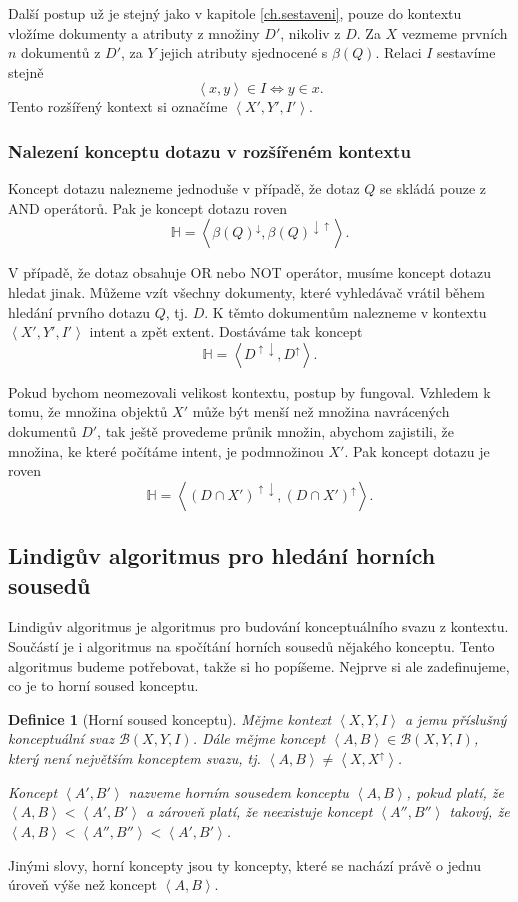 \documentclass[12pt]{article}
\newcommand{\ssection}[1]{\subsection{#1}}
\newcommand{\sssection}[1]{\subsubsection{#1}}
\newcommand{\addsp}[1]{\left<#1\right>}
\newcommand{\context}{\addsp{X, Y, I}}
\newcommand{\lattice}{\mathcal{B}(X, Y, I)}
\newcommand{\up}{^{\uparrow}}
\newcommand{\down}{^{\downarrow}}
\newcommand{\updown}{^{\uparrow\downarrow}}
\newcommand{\downup}{^{\downarrow\uparrow}}
\newcommand{\hledany}{\mathbb{H}}
\newtheorem{mydef}{Definice}
\begin{document}
Další postup už je stejný jako v kapitole \ref{ch.sestaveni}, pouze do kontextu vložíme dokumenty a atributy z množiny $D'$, nikoliv z $D$. Za $X$ vezmeme prvních $n$ dokumentů z $D'$, za $Y$ jejich atributy sjednocené s $\beta(Q)$. Relaci $I$ sestavíme stejně
$$
\addsp{x,y} \in I \iff y \in x.
$$
Tento rozšířený kontext si označíme $\addsp{X', Y', I'}$. 

\sssection{Nalezení konceptu dotazu v rozšířeném kontextu}
Koncept dotazu nalezneme jednoduše v případě, že dotaz $Q$ se skládá pouze z AND operátorů. Pak je koncept dotazu roven
$$
\hledany=\addsp{\beta(Q)\down, \beta(Q)\downup}.
$$

V případě, že dotaz obsahuje OR nebo NOT operátor, musíme koncept dotazu hledat jinak. Můžeme vzít všechny dokumenty, které vyhledávač vrátil během hledání prvního dotazu $Q$, tj. $D$. K těmto dokumentům nalezneme v kontextu $\addsp{X', Y', I'}$ intent a zpět extent. Dostáváme tak koncept
$$
\hledany=\addsp{D\updown, D\up}.
$$

Pokud bychom neomezovali velikost kontextu, postup by fungoval. Vzhledem k tomu, že množina objektů $X'$ může být menší než množina navrácených dokumentů $D'$, tak ještě provedeme průnik množin, abychom zajistili, že množina, ke které počítáme intent, je podmnožinou $X'$. Pak koncept dotazu je roven
$$
\hledany=\addsp{(D\cap X')\updown, (D\cap X')\up}.
$$

\ssection{Lindigův algoritmus pro hledání horních sousedů}
Lindigův algoritmus je algoritmus pro budování konceptuálního svazu z kontextu. Součástí je i algoritmus na spočítání horních sousedů nějakého konceptu. Tento algoritmus budeme potřebovat, takže si ho popíšeme. Nejprve si ale zadefinujeme, co je to horní soused konceptu. 

\begin{mydef}[Horní soused konceptu]
Mějme kontext $\context$ a jemu příslušný konceptuální svaz $\lattice$. Dále mějme koncept $\addsp{A, B} \in \lattice$, který není největším konceptem svazu, tj. $\addsp{A, B}\ne\addsp{X, X\up}$. 

Koncept $\addsp{A', B'}$ nazveme horním sousedem konceptu $\addsp{A, B}$, pokud platí, že $\addsp{A, B} < \addsp{A', B'}$ a zároveň platí, že neexistuje koncept $\addsp{A'', B''}$ takový, že $\addsp{A, B} < \addsp{A'', B''} < \addsp{A', B'}$.
\end{mydef}

Jinými slovy, horní koncepty jsou ty koncepty, které se nachází právě o jednu úroveň výše než koncept $\addsp{A, B}$.
\end{document}

